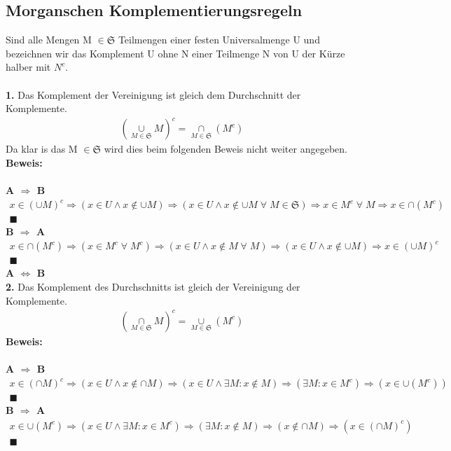 \documentclass[../AbiMappe_Mathe.tex]{subfiles}
\begin{document}
 \subsection{Morganschen Komplementierungsregeln}
 Sind alle Mengen M $\in \mathfrak{S}$ Teilmengen einer festen Universalmenge U und bezeichnen wir das Komplement U ohne N einer Teilmenge N von U der Kürze halber mit $N^c$.\\\\
 \textbf{1. }Das Komplement der Vereinigung ist gleich dem Durchschnitt der Komplemente.\\
 \begin{align*}
	(\underset{M \in \mathfrak{S}}{\overset{}{\cup}}M)^c =  \underset{M \in \mathfrak{S}}{\overset{}{\cap}}(M^c)
 \end{align*}
 Da klar is das M $\in \mathfrak{S}$ wird dies beim folgenden Beweis nicht weiter angegeben.\\
\textbf{Beweis:}\\\\
\textbf{A $\Rightarrow$ B }
\begin{align*}
	x \in (\cup M)^c \Rightarrow (x \in U \land x \notin \cup M ) \Rightarrow (x \in U \land x \notin \cup M \; \forall \; M \in \mathfrak{S}) \Rightarrow x\in M^c\;\forall\; M \Rightarrow x \in \cap(M^c)\\
	\blacksquare
 \end{align*}
 \textbf{B $\Rightarrow$ A }\\
 \begin{align*}
 x \in \cap (M^c) \Rightarrow (x \in M^c\;\forall\;M^c) \Rightarrow (x \in U \land x \notin M\; \forall\; M) \Rightarrow (x \in U \land x \notin \cup M) \Rightarrow x \in (\cup M)^c\\
 \blacksquare
 \end{align*}
 \textbf{A $\Leftrightarrow$ B}
 \\\textbf{2. }Das Komplement des Durchschnitts ist gleich der Vereinigung der Komplemente.\\
 \begin{align*}
	(\underset{M \in \mathfrak{S}}{\overset{}{\cap}}M)^c =  \underset{M \in \mathfrak{S}}{\overset{}{\cup}}(M^c)
 \end{align*}
\textbf{Beweis:}\\\\
\textbf{A $\Rightarrow$ B } 
\begin{align*}
x \in (\cap M)^c \Rightarrow (x \in U \land x \notin \cap M) \Rightarrow (x \in U \land \exists M : x \notin M ) \Rightarrow (\exists M : x \in M^c ) \Rightarrow (x \in \cup (M^c))\\
 	\blacksquare
\end{align*}
 \textbf{B $\Rightarrow$ A }\\
 \begin{align*}
 x \in \cup(M^c) \Rightarrow (x \in U \land \exists M : x \in M^c ) \Rightarrow (\exists M : x \notin M) \Rightarrow ( x \notin \cap M) \Rightarrow (x \in (\cap M)^c)\\
 	\blacksquare
 \end{align*}
\end{document}

